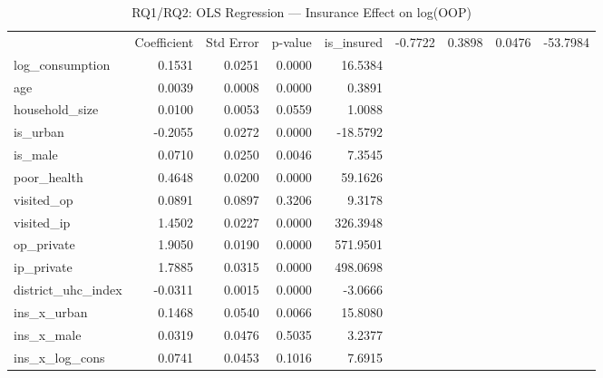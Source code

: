 \begin{table}
\caption{RQ1/RQ2: OLS Regression — Insurance Effect on log(OOP)}
\label{tab:rq1_ols}
\begin{tabular}{lrrrr}
\toprule
 & Coefficient & Std Error & p-value & %
\midrule
is_insured & -0.7722 & 0.3898 & 0.0476 & -53.7984 \\
log_consumption & 0.1531 & 0.0251 & 0.0000 & 16.5384 \\
age & 0.0039 & 0.0008 & 0.0000 & 0.3891 \\
household_size & 0.0100 & 0.0053 & 0.0559 & 1.0088 \\
is_urban & -0.2055 & 0.0272 & 0.0000 & -18.5792 \\
is_male & 0.0710 & 0.0250 & 0.0046 & 7.3545 \\
poor_health & 0.4648 & 0.0200 & 0.0000 & 59.1626 \\
visited_op & 0.0891 & 0.0897 & 0.3206 & 9.3178 \\
visited_ip & 1.4502 & 0.0227 & 0.0000 & 326.3948 \\
op_private & 1.9050 & 0.0190 & 0.0000 & 571.9501 \\
ip_private & 1.7885 & 0.0315 & 0.0000 & 498.0698 \\
district_uhc_index & -0.0311 & 0.0015 & 0.0000 & -3.0666 \\
ins_x_urban & 0.1468 & 0.0540 & 0.0066 & 15.8080 \\
ins_x_male & 0.0319 & 0.0476 & 0.5035 & 3.2377 \\
ins_x_log_cons & 0.0741 & 0.0453 & 0.1016 & 7.6915 \\
\bottomrule
\end{tabular}
\end{table}
